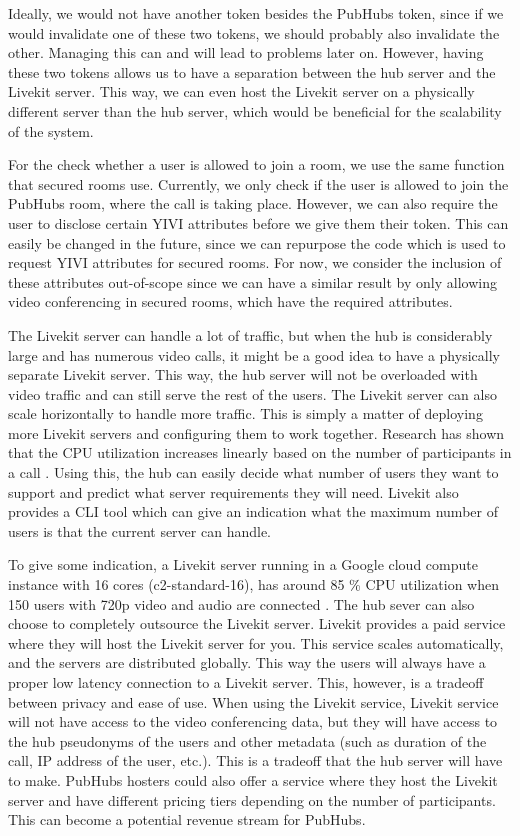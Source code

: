 \documentclass{report}
\begin{document}
Ideally, we would not have another token besides the PubHubs token, since if we would invalidate one of these two
tokens, we should probably also invalidate the other. Managing this can and will lead to problems later on. However,
having these two tokens allows us to have a separation between the hub server and the Livekit server. This way, we
can even host the Livekit server on a physically different server than the hub server, which would be beneficial for
the scalability of the system.

For the check whether a user is allowed to join a room, we use the same function that secured rooms use. Currently,
we only check if the user is allowed to join the PubHubs room, where the call is taking place. However, we can also
require the user to disclose certain YIVI attributes before we give them their token. This can easily be changed in the
future, since we can repurpose the code which is used to request YIVI attributes for secured rooms. For now, we consider
the inclusion of these attributes out-of-scope since we can have a similar result by only allowing video conferencing
in secured rooms, which have the required attributes.

The Livekit server can handle a lot of traffic, but when the hub is considerably large and has numerous video calls, it
might be a good idea to have a physically separate Livekit server. This way, the hub server will not be overloaded with
video traffic and can still serve the rest of the users. The Livekit server can also scale horizontally to handle
more traffic. This is simply a matter of deploying more Livekit servers and configuring them to work together.
Research has shown that the CPU utilization increases linearly based on the number of participants in a call
\cite{muscariello_securing_2023}. Using this, the hub can easily decide what number of users
they want to support and predict what server requirements they will need. Livekit also provides a CLI tool which
can give an indication what the maximum number of users is that the current server can handle.

To give some indication, a Livekit server running in a Google cloud compute instance with 16 cores
(c2-standard-16), has around 85 \% CPU utilization when 150 users with 720p video and audio are connected
\cite{noauthor_benchmarking_nodate}. The hub sever can also choose to completely outsource the Livekit server.
Livekit provides a paid service where they will host the Livekit server for you. This service scales
automatically, and the servers are distributed globally. This way the users will always have a proper low
latency connection to a Livekit server. This, however, is a tradeoff between privacy and ease of use. When using
the Livekit service, Livekit service will not have access to the video conferencing data, but they will have access to
the hub pseudonyms of the users and other metadata (such as duration of the call, IP address of the user, etc.). This
is a tradeoff that the hub server will have to make. PubHubs hosters could also offer a service where they host the
Livekit server and have different pricing tiers depending on the number of participants. This can become a potential
revenue stream for PubHubs.
\end{document}
